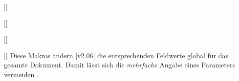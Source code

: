 \begin{Declaration*}{}
\begin{Declaration*}{}
\begin{Declaration*}{}
\begin{Declaration}{[]}
\begin{Declaration}{[]}
\begin{Declaration}{[]}
\begin{Declaration}{[]}
\printdeclarationlist%
%
Diese Makros ändern
[v2.06]
die entsprechenden Feldwerte global für das gesamte Dokument. 
Damit lässt sich die \emph{mehrfache} Angabe eines Parameters vermeiden%
. 
%
%
\end{Declaration}
\end{Declaration}
\end{Declaration}
\end{Declaration}


\end{Declaration*}
\end{Declaration*}
\end{Declaration*}
